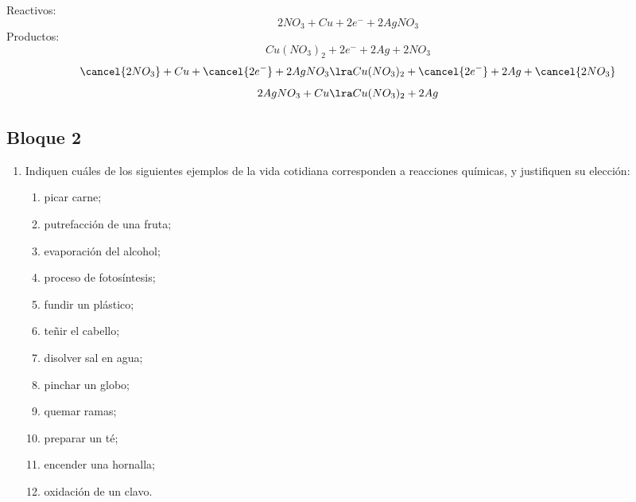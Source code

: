 \documentclass[../Práctica.root.tex]{subfiles}
\begin{document}
\begin{enumerate}
\begin{enumerate}

                    Reactivos:
                    \[ 2 NO_3 + Cu + 2 e^- + 2 AgNO_3 \]
                    Productos:
                    \[ Cu(NO_3)_2 + 2 e^- + 2 Ag + 2 NO_3 \]
                    \[ \cancel{2 NO_3} + Cu + \cancel{2 e^-} + 2 AgNO_3 \lra Cu(NO_3)_2 + \cancel{2 e^-} + 2 Ag + \cancel{2 NO_3} \]
                    \[ 2 AgNO_3 + Cu \lra Cu(NO_3)_2 + 2 Ag \]
          \end{enumerate}
\end{enumerate}
\subsection{Bloque 2}
\begin{enumerate}
    \item Indiquen cuáles de los siguientes ejemplos de la vida cotidiana corresponden a reacciones
          químicas, y justifiquen su elección:
          \begin{enumerate}
              \item picar carne;
              \item putrefacción de una fruta; \checkmark
              \item evaporación del alcohol;
              \item proceso de fotosíntesis; \checkmark
              \item fundir un plástico;
              \item teñir el cabello; \checkmark %
              \item disolver sal en agua; %
              \item pinchar un globo;
              \item quemar ramas; \checkmark
              \item preparar un té;
              \item encender una hornalla; \checkmark
              \item oxidación de un clavo. \checkmark
          \end{enumerate}


\end{enumerate}
\end{document}
